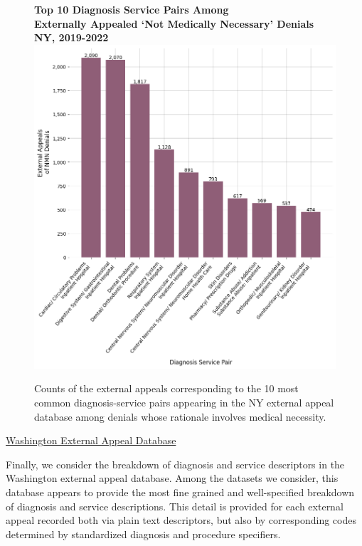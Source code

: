 \documentclass[12pt, a4paper,twoside,parskip=full]{report}
\theoremstyle{plain} %
\theoremstyle{definition} %
\theoremstyle{remark} %
\numberwithin{equation}{chapter}
\begin{document}
		\begin{figure}[h!]
			\centering
			\textbf{Top 10 Diagnosis Service Pairs Among}\\
			\textbf{Externally Appealed `Not Medically Necessary' Denials}\\
			\textbf{NY, 2019-2022}\\
			\includegraphics[width=.8\textwidth]{images/nys_external/top_nmn_appeal_diag_service.png}
			\caption{Counts of the external appeals corresponding to the 10 most common diagnosis-service pairs appearing in the NY external appeal database among denials whose rationale involves medical necessity.}
			\label{nynmnexternalappealdiagservice}
		\end{figure}
		\clearpage
	
		\underline{Washington External Appeal Database}
		
		Finally, we consider the breakdown of diagnosis and service descriptors in the Washington external appeal database. Among the datasets we consider, this database appears to provide the most fine grained and well-specified breakdown of diagnosis and service descriptions. This detail is provided for each external appeal recorded both via plain text descriptors, but also by corresponding codes determined by standardized diagnosis and procedure specifiers.
		
\end{document}
